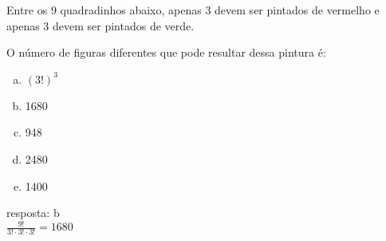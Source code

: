\begin{ex}
Entre os 9 quadradinhos abaixo, apenas 3 devem ser pintados de vermelho e apenas 3 devem ser pintados de verde.
\begin{center}
\end{center}


O número de figuras diferentes que pode resultar dessa pintura é:
   \begin{enumerate}[(a)]
   \item $(3!)^3$
   \item 1680
   \item 948
   \item 2480
   \item 1400
   \end{enumerate}
      \begin{sol}
      resposta: b\\
      $\frac{9!}{3!\cdot3!\cdot3!}=1680$
      \end{sol}
\end{ex}